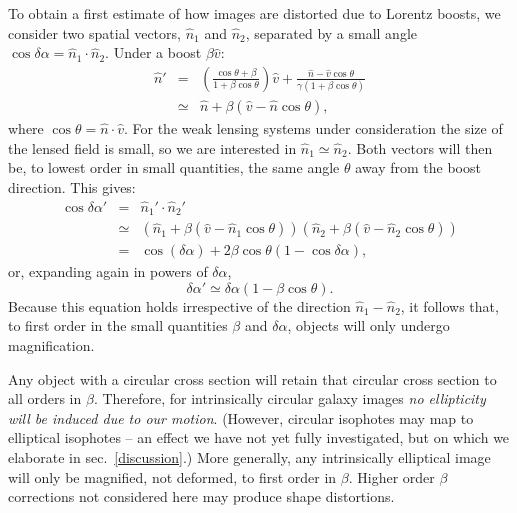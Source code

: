 \documentclass[useAMS,fleqn, usenatbib]{mn2e}
\begin{document}
To obtain a first estimate of how images are distorted due to Lorentz boosts, we 
consider two spatial vectors, $\hat{n}_1$ and $\hat{n}_2$, separated by a small 
angle $\cos\delta\alpha = \hat{n}_1\cdot\hat{n}_2$. 
%
Under a boost $\beta \hat{v}$:
\begin{eqnarray}
    \hat{n}' & = &
    \left( \frac{\cos\theta+\beta}{1+\beta \cos\theta} \right) \hat{v}
    + \frac{\hat{n}-\hat{v}\cos\theta}{\gamma(1+\beta\cos\theta)} \\
    & \simeq & \hat{n} + \beta \left( \hat{v} - \hat{n}\cos\theta \right),
\end{eqnarray}
where $\cos\theta = \hat{n}\cdot\hat{v}$.  For the weak lensing systems under consideration
the size of the lensed field is small, so we are interested in  $\hat{n}_1 \simeq \hat{n}_2$.
Both vectors will then be, to lowest order in small quantities, 
the same angle $\theta$ away from the boost direction. 
This gives:
\begin{eqnarray}
    \cos\delta\alpha'& \!\!\!\!\!=\!\!\!\!\! & \hat{n}_1'\cdot\hat{n}_2' \\
    &\!\!\!\!\! \simeq \!\!\!\!\!& \left( \hat{n}_1 + \beta \left( \hat{v} - \hat{n}_1\cos\theta \right) \right)
    \left( \hat{n}_2 + \beta \left( \hat{v} - \hat{n}_2\cos\theta \right) \right) \\
    &\!\!\!\!\! =\!\!\!\!\! & \cos(\delta\alpha) + 2\beta\cos\theta\left( 1-\cos\delta\alpha \right),
\end{eqnarray}
or, expanding again in powers of $\delta\alpha$,
\begin{equation}
    \delta\alpha' \simeq \delta\alpha \left( 1 - \beta\cos\theta \right).
\end{equation}
Because this equation holds irrespective of the direction $\hat{n}_1-\hat{n}_2$, it follows that,
to first order in the small quantities $\beta$ and $\delta\alpha$,
objects will only undergo magnification.


Any object with a circular cross section
will retain that circular cross section to all orders in $\beta$.
Therefore, for intrinsically circular galaxy images  {\it{no ellipticity will 
be induced due to our motion}}.
(However, circular isophotes may map to elliptical isophotes -- an effect
we have not yet fully investigated, but on which we elaborate in sec.~\ref{discussion}.)
More generally,  any intrinsically elliptical image will only be magnified, 
not deformed, to first order in $\beta$. Higher order
$\beta$ corrections not considered here may produce shape 
distortions. 
\end{document}
